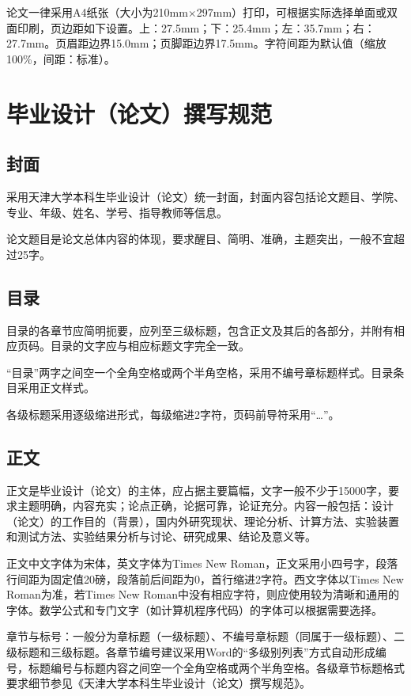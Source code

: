 论文一律采用A4纸张（大小为210mm$\times$297mm）打印，可根据实际选择单面或双面印刷，页边距如下设置。上：27.5mm；下：25.4mm；左：35.7mm；右：27.7mm。页眉距边界15.0mm；页脚距边界17.5mm。字符间距为默认值（缩放100\%，间距：标准）。


\section{毕业设计（论文）撰写规范}

\subsection{封面}

采用天津大学本科生毕业设计（论文）统一封面，封面内容包括论文题目、学院、专业、年级、姓名、学号、指导教师等信息。

论文题目是论文总体内容的体现，要求醒目、简明、准确，主题突出，一般不宜超过25字。

\subsection{目录}

目录的各章节应简明扼要，应列至三级标题，包含正文及其后的各部分，并附有相应页码。目录的文字应与相应标题文字完全一致。

“目录”两字之间空一个全角空格或两个半角空格，采用不编号章标题样式。目录条目采用正文样式。

各级标题采用逐级缩进形式，每级缩进2字符，页码前导符采用“…”。

\subsection{正文}

正文是毕业设计（论文）的主体，应占据主要篇幅，文字一般不少于15000字，要求主题明确，内容充实；论点正确，论据可靠，论证充分。内容一般包括：设计（论文）的工作目的（背景），国内外研究现状、理论分析、计算方法、实验装置和测试方法、实验结果分析与讨论、研究成果、结论及意义等。

正文中文字体为宋体，英文字体为Times New Roman，正文采用小四号字，段落行间距为固定值20磅，段落前后间距为0，首行缩进2字符。西文字体以Times New Roman为准，若Times New Roman中没有相应字符，则应使用较为清晰和通用的字体。数学公式和专门文字（如计算机程序代码）的字体可以根据需要选择。

章节与标号：一般分为章标题（一级标题）、不编号章标题（同属于一级标题）、二级标题和三级标题。各章节编号建议采用Word的“多级别列表”方式自动形成编号，标题编号与标题内容之间空一个全角空格或两个半角空格。各级章节标题格式要求细节参见《天津大学本科生毕业设计（论文）撰写规范》。

